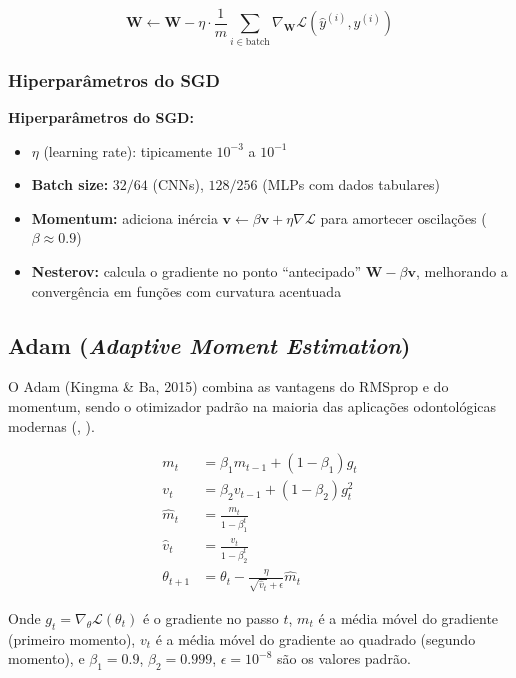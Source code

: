 \begin{equation}
  \mathbf{W} \leftarrow \mathbf{W} - \eta \cdot \frac{1}{m} \sum_{i \in \text{batch}}
    \nabla_{\mathbf{W}} \mathcal{L}(\hat{y}^{(i)}, y^{(i)})
  \label{eq:sgd}
\end{equation}

\subsubsection{Hiperparâmetros do SGD}

\textbf{Hiperparâmetros do SGD:}
\begin{itemize}
  \item $\eta$ (learning rate): tipicamente $10^{-3}$ a $10^{-1}$
  \item \textbf{Batch size:} $32/64$ (CNNs), $128/256$ (MLPs com dados tabulares)
  \item \textbf{Momentum:} adiciona inércia $\mathbf{v} \leftarrow \beta\mathbf{v} + \eta\nabla\mathcal{L}$
        para amortecer oscilações ($\beta \approx 0.9$)
  \item \textbf{Nesterov:} calcula o gradiente no ponto ``antecipado''
        $\mathbf{W} - \beta\mathbf{v}$, melhorando a convergência em funções
        com curvatura acentuada
\end{itemize}

\subsection{Adam (\textit{Adaptive Moment Estimation})}

O Adam (Kingma \& Ba, 2015) combina as vantagens do RMSprop e do momentum,
sendo o otimizador padrão na maioria das aplicações odontológicas modernas
(, ).

\begin{align}
  m_t &= \beta_1 m_{t-1} + (1 - \beta_1) g_t \label{eq:adam-m} \\
  v_t &= \beta_2 v_{t-1} + (1 - \beta_2) g_t^2 \label{eq:adam-v} \\
  \hat{m}_t &= \frac{m_t}{1 - \beta_1^t} \label{eq:adam-mhat} \\
  \hat{v}_t &= \frac{v_t}{1 - \beta_2^t} \label{eq:adam-vhat} \\
  \theta_{t+1} &= \theta_t - \frac{\eta}{\sqrt{\hat{v}_t} + \epsilon} \hat{m}_t \label{eq:adam-update}
\end{align}

Onde $g_t = \nabla_{\theta} \mathcal{L}(\theta_t)$ é o gradiente no passo $t$,
$m_t$ é a média móvel do gradiente (primeiro momento), $v_t$ é a média móvel do
gradiente ao quadrado (segundo momento), e $\beta_1=0.9$, $\beta_2=0.999$,
$\epsilon=10^{-8}$ são os valores padrão.

